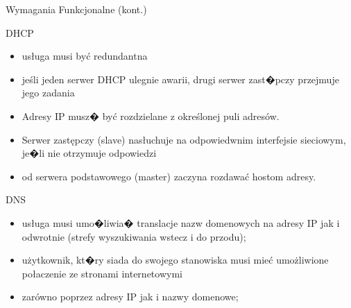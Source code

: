 \documentclass[presentation]{beamer}
\begin{document}
\begin{frame}[label={sec:orga14ab3d}]{Wymagania Funkcjonalne (kont.)}
\begin{block}{DHCP}
\begin{itemize}
\item usługa musi być redundantna
\item jeśli jeden serwer DHCP ulegnie awarii, drugi serwer zast�pczy przejmuje jego zadania
\item Adresy IP musz� być rozdzielane z określonej puli adresów.
\item Serwer zastępczy (slave) nasłuchuje na odpowiedwnim interfejsie sieciowym, je�li nie otrzymuje odpowiedzi
\item od serwera podstawowego (master) zaczyna rozdawać hostom adresy.
\end{itemize}
\end{block}
\begin{block}{DNS}
\begin{itemize}
\item usługa musi umo�liwia� translacje nazw domenowych na adresy IP jak i odwrotnie (strefy wyszukiwania wstecz i do przodu);
\item użytkownik, kt�ry siada do swojego stanowiska musi mieć umożliwione połaczenie ze stronami internetowymi
\item zarówno poprzez adresy IP jak i nazwy domenowe;
\end{itemize}
\end{block}
\end{frame}
\end{document}
